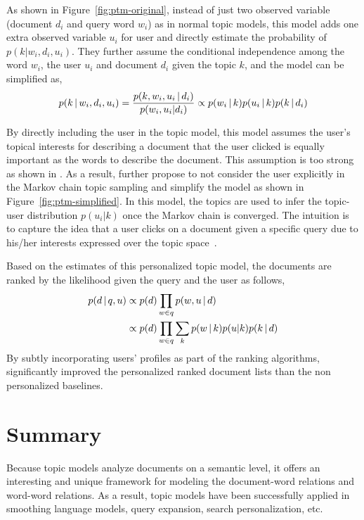 As shown in Figure~\ref{fig:ptm-original}, instead of just two observed variable (document $d_i$ and query word $w_i$) as in normal topic models, this model adds one extra observed variable $u_i$ for user and directly estimate the probability of $p(k|w_i, d_i, u_i)$. They further assume the conditional independence among the word $w_i$, the user $u_i$ and document $d_i$ given the topic $k$, and the model can be simplified as,
\begin{align}
p(k \, | \, w_i, d_i, u_i) = \frac{p(k,w_i, u_i  \, | \,  d_i)}{p(w_i, u_i | d_i)} \propto p(w_i \, | \, k) p(u_i \, | \, k) p (k \, | \, d_i)
\end{align}

By directly including the user in the topic model, this model assumes the user's topical interests for describing a document that the user clicked is equally important as the words to describe the document. This assumption is too strong as shown in \citet{Carman-2010}. As a result, \citet{Harvey-2013} further propose to not consider the user explicitly in the Markov chain topic sampling and simplify the model as shown in Figure~\ref{fig:ptm-simplified}. In this model, the topics are used to infer the topic-user distribution $p(u_i|k)$ once the Markov chain is converged. The intuition is to capture the idea that a user clicks on a document given a specific query due to his/her interests expressed over the topic space~\citep{Harvey-2013}.

Based on the estimates of this personalized topic model, the documents are ranked by the likelihood given the query and the user as follows,
\begin{align}
p(d  \, | \,  q,u) &\propto p(d) \prod_{w \in q} p(w, u  \, | \,  d)\\
&\propto p(d) \prod_{w \in q} \sum_k p(w \, | \, k) p(u|k) p(k \, | \, d) \notag
\end{align}
By subtly incorporating users' profiles as part of the ranking algorithms, \citet{Harvey-2013} significantly improved the personalized ranked document lists than the non personalized baselines.

\section{Summary}

Because topic models analyze documents on a semantic level, it offers
an interesting and unique framework for modeling the document-word
relations and word-word relations. As a result, topic models have been
successfully applied in smoothing language models, query expansion, search personalization, etc.

